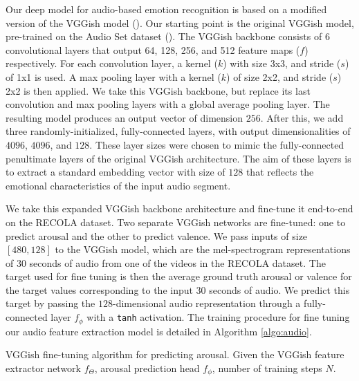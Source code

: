 \documentclass[times,twocolumn,final,authoryear]{elsarticle}
\begin{document}
	Our deep model for audio-based emotion recognition is based on a modified version of the VGGish model (\cite{Vggish2017}). Our starting point is the original VGGish model, pre-trained on the Audio Set dataset (\cite{audioSet}). The VGGish backbone consists of 6 convolutional layers that output 64, 128, 256, and 512 feature maps ($f$) respectively. For each convolution layer, a kernel ($k$) with size 3x3, and stride ($s$) of 1x1 is used. A max pooling layer with a kernel ($k$) of size 2x2, and stride ($s$) 2x2 is then applied. We take this VGGish backbone, but replace its last convolution and max pooling layers with a global average pooling layer. The resulting model produces an output vector of dimension $256$. After this, we add three randomly-initialized, fully-connected layers, with output dimensionalities of $4096$, $4096$, and $128$. These layer sizes were chosen to mimic the fully-connected penultimate layers of the original VGGish architecture. The aim of these layers is to extract a standard embedding vector with size of $128$ that reflects the emotional characteristics of the input audio segment.
	
	We take this expanded VGGish backbone architecture and fine-tune it end-to-end on the RECOLA dataset. Two separate VGGish networks are fine-tuned: one to predict arousal and the other to predict valence. We pass inputs of size $[480,128]$ to the VGGish model, which are the mel-spectrogram representations of 30 seconds of audio from one of the videos in the RECOLA dataset. The target used for fine tuning is then the average ground truth arousal or valence for the target values corresponding to the input 30 seconds of audio. We predict this target by passing the $128$-dimensional audio representation through a fully-connected layer $f_{\phi}$ with a \texttt{tanh} activation. The training procedure for fine tuning our audio feature extraction model is detailed in Algorithm \ref{algo:audio}.
	
	\begin{algorithm2e}
		\SetAlgoLined
		\caption{VGGish fine-tuning algorithm for predicting arousal. Given the VGGish feature extractor network $f_{\Theta}$, arousal prediction head $f_{\phi}$, number of training steps $N$.}
		\label{algo:audio}
	\end{algorithm2e}
	
\end{document}
